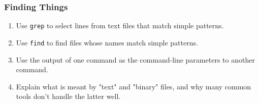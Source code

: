 \documentclass[xcolor=dvipsnames]{beamer}
\begin{document}
\begin{frame}
\frametitle{Finding Things}
\begin{enumerate}
  \item Use {\tt grep} to select lines from text files that match simple patterns.
  \item Use {\tt find} to find files whose names match simple patterns.
  \item Use the output of one command as the command-line parameters to another command.
  \item Explain what is meant by "text" and "binary" files, and why many common tools don't handle the latter well.
\end{enumerate}
\end{frame}
\end{document}
